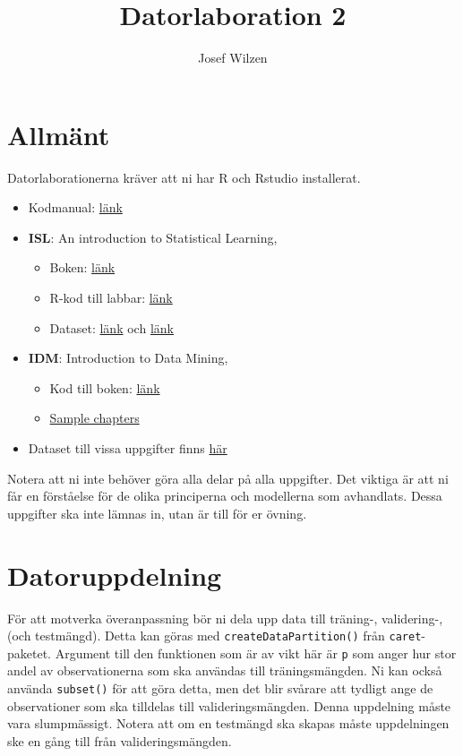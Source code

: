\documentclass[a4paper]{article}
\title{Datorlaboration 2}
\author{Josef Wilzen}
\begin{document}
\maketitle
\thispagestyle{fancy}


\section*{Allmänt}

Datorlaborationerna kräver att ni har R och Rstudio installerat.
\begin{itemize}
    \item Kodmanual: \href{https://www.isakhietala.com/teaching/732g12/}{länk}
    \item \textbf{ISL}: An introduction to Statistical Learning,
    \begin{itemize}
        \item Boken: \href{https://www.statlearning.com/}{länk}
        \item R-kod till labbar: \href{https://www.statlearning.com/resources-second-edition}{länk}
        \item Dataset: \href{https://cran.r-project.org/web/packages/ISLR2/index.html}{länk} och \href{https://www.statlearning.com/resources-second-edition}{länk}
    \end{itemize}
    \item \textbf{IDM}: Introduction to Data Mining,
    \begin{itemize}
        \item Kod till boken: \href{https://mhahsler.github.io/Introduction_to_Data_Mining_R_Examples/}{länk}
        \item \href{https://www-users.cse.umn.edu/~kumar001/dmbook/index.php#chapters}{Sample chapters}
    \end{itemize}
    \item Dataset till vissa uppgifter finns \href{https://github.com/STIMALiU/732G12_DM/tree/master/data}{här}
\end{itemize}
Notera att ni inte behöver göra alla delar på alla uppgifter. Det viktiga är att ni får en förståelse för de olika principerna och modellerna som avhandlats. Dessa uppgifter ska inte lämnas in, utan är till för er övning.

\section*{Datoruppdelning}

För att motverka överanpassning bör ni dela upp data till träning-, validering-, (och testmängd). Detta kan göras med \texttt{createDataPartition()} från \texttt{caret}-paketet. Argument till den funktionen som är av vikt här är \texttt{p} som anger hur stor andel av observationerna som ska användas till träningsmängden. Ni kan också använda \texttt{subset()} för att göra detta, men det blir svårare att tydligt ange de observationer som ska tilldelas till valideringsmängden. Denna uppdelning måste vara slumpmässigt. Notera att om en testmängd ska skapas måste uppdelningen ske en gång till från valideringsmängden.
\end{document}
